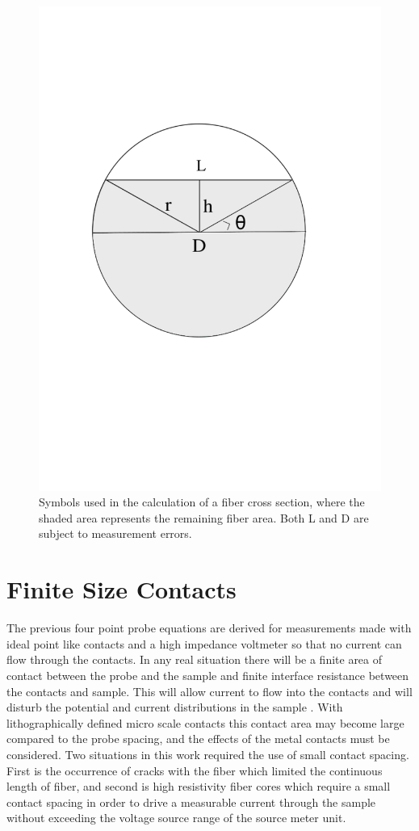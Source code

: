 \begin{figure}
    \centering
    \includegraphics[width=.7\textwidth]{fig/polishing/fiberdiagram.jpg}
    \caption{Symbols used in the calculation of a fiber cross section, where the shaded area represents the remaining fiber area. Both L and D are subject to measurement errors.}
    \label{fig:fiber}
\end{figure}

  
    \FloatBarrier
\section{Finite Size Contacts}
 The previous four point probe equations are derived for measurements made with ideal point like contacts and a high impedance voltmeter so that no current can flow through the contacts. In any real situation there will be a finite area of contact between the probe and the sample and finite interface resistance between the contacts and sample. This will allow current to flow into the contacts and will disturb the potential and current distributions in the sample \cite{Zimney2007CorrectionStudy}. With lithographically defined micro scale contacts this contact area may become large compared to the probe spacing, and the effects of the metal contacts must be considered. %
 Two situations in this work required the use of small contact spacing. First is the occurrence of cracks with the fiber which limited the continuous length of fiber, and second is high resistivity fiber cores which require a small contact spacing in order to drive a measurable current through the sample without exceeding the voltage source range of the source meter unit. 
 
